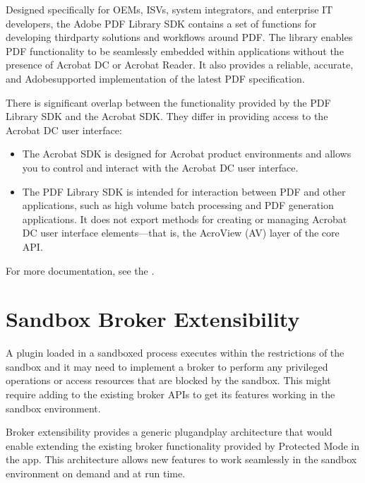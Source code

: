 \documentclass[letterpaper,12pt,english,openany,oneside]{sphinxmanual}
\begin{document}
Designed specifically for OEMs, ISVs, system integrators, and enterprise IT developers, the Adobe PDF Library SDK contains a set of functions for developing third\sphinxhyphen{}party solutions and workflows around PDF. The library enables PDF functionality to be seamlessly embedded within applications without the presence of Acrobat DC or Acrobat Reader. It also provides a reliable, accurate, and Adobe\sphinxhyphen{}supported implementation of the latest PDF specification.

There is significant overlap between the functionality provided by the PDF Library SDK and the Acrobat SDK. They differ in providing access to the Acrobat DC user interface:
\begin{itemize}
\item {} 
The Acrobat SDK is designed for Acrobat product environments and allows you to control and interact with the Acrobat DC user interface.

\item {} 
The PDF Library SDK is intended for interaction between PDF and other applications, such as high volume batch processing and PDF generation applications. It does not export methods for creating or managing Acrobat DC user interface elements—that is, the AcroView (AV) layer of the core API.

\end{itemize}

For more documentation, see the  .


\chapter{Sandbox Broker Extensibility}
\label{\detokenize{SandboxBrokerExt:sandbox-broker-extensibility}}\label{\detokenize{SandboxBrokerExt::doc}}
A plug\sphinxhyphen{}in loaded in a sandboxed process executes within the restrictions of the sandbox and it may need to implement a broker to perform any privileged operations or access resources that are blocked by the sandbox. This might require adding to the existing broker APIs to get its features working in the sandbox environment.

Broker extensibility provides a generic plug\sphinxhyphen{}and\sphinxhyphen{}play architecture that would enable extending the existing broker functionality provided by Protected Mode in the app. This architecture allows new features to work seamlessly in the sandbox environment on demand and at run time.
\end{document}

